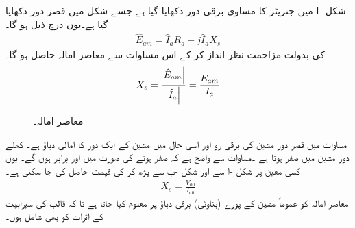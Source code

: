 شکل -ا  میں جنریٹر کا مساوی برقی دور دکھایا گیا ہے جسے  شکل   میں قصر دور دکھایا گیا ہے۔یوں درج ذیل ہو گا۔
\begin{align}
\hat{E}_{am}=\hat{I}_a R_a+j \hat{I}_a X_s
\end{align}
 کی بدولت مزاحمت   نظر انداز کر کے اس مساوات سے معاصر امالہ حاصل ہو گا۔
\begin{align}\label{مساوات_معاصر_معاصر_امالہ_پیمائش}
X_s=\frac{\abs{\hat{E}_{am}}}{\abs{\hat{I}_a}}=\frac{E_{am}}{I_a}
\end{align}
%
\begin{figure}
\centering
\caption{معاصر امالہ۔}
\label{شکل_معاصر_امالہ_معاصر}
\end{figure}
مساوات  میں  قصر دور مشین کی  برقی رو اور   اسی حال میں مشین کے ایک دور کا امالی دباؤ ہے۔ کھلے دور مشین میں  صفر ہوتا ہے ۔مساوات  سے واضح ہے کہ   صفر ہونے کی صورت میں   اور  برابر ہوں گے۔ یوں  کسی معین  پر شکل -ا سے   اور شکل -ب سے  پڑھ کر  کی قیمت حاصل کی جا سکتی ہے۔
\begin{align}\label{مساوات_معاصر_امالہ_پیمائش}
X_s=\frac{V_{a0}}{I_{a0}}
\end{align}
معاصر امالہ کو عموماً مشین کے پورے (بناوٹی) برقی دباؤ پر معلوم کیا جاتا ہے تا کہ قالب کی سیرابیت کے اثرات کو بھی شامل ہوں۔

